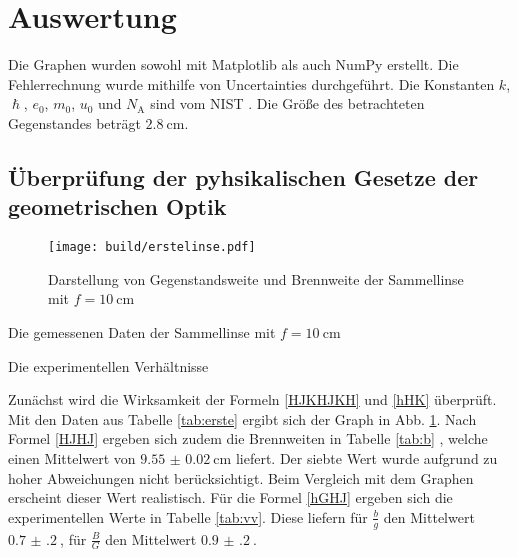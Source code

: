 \section{Auswertung}
\label{sec:Auswertung}


Die Graphen wurden sowohl mit Matplotlib \cite{matplotlib} als auch NumPy \cite{numpy} erstellt. Die
Fehlerrechnung wurde mithilfe von Uncertainties \cite{uncertainties} durchgeführt.
Die Konstanten $k$, $\hslash$, $e_0$, $m_0$, $u_0$ und $N_\text{A}$ sind vom NIST \cite{nistgov}. Die Größe des betrachteten Gegenstandes beträgt $\SI{2.8}{\centi\meter}$.



\subsection{Überprüfung der pyhsikalischen Gesetze der geometrischen Optik}

\begin{figure}
 \centering
 \texttt{[image: build/erstelinse.pdf]}
 \caption{Darstellung von Gegenstandsweite und Brennweite der Sammellinse mit $f = \SI{10}{\centi\meter}$}
 \label{fig:erste}
\end{figure}

\begin{table}
	\centering
	\caption{Die gemessenen Daten der Sammellinse mit $f = \SI{10}{\centi\meter}$}
	
	\label{tab:b}
\end{table}

\begin{table}
	\centering
	\caption{Die experimentellen Verhältnisse}
	
	\label{tab:vv}
\end{table}

Zunächst wird die Wirksamkeit der Formeln \eqref{HJKHJKH} und \eqref{hHK} überprüft.
Mit den Daten aus Tabelle \ref{tab:erste} ergibt sich der Graph in Abb. \ref{fig:erste}. Nach Formel \eqref{HJHJ} ergeben sich zudem die Brennweiten in Tabelle \ref{tab:b}
, welche einen Mittelwert von $\SI{9.55(2)}{\centi\meter}$ liefert. Der siebte Wert wurde aufgrund zu hoher Abweichungen nicht berücksichtigt. Beim Vergleich mit dem Graphen erscheint dieser Wert realistisch.
Für die Formel \eqref{hGHJ} ergeben sich die experimentellen Werte in Tabelle \ref{tab:vv}. Diese liefern für $\frac{b}{g}$ den Mittelwert
$\SI{0.7(2)}{}$, für $\frac{B}{G}$ den Mittelwert $\SI{0.9(2)}{}$.



